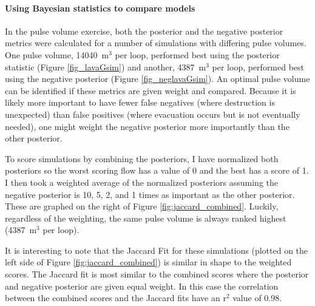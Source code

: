 \documentclass[12pt,letter]{article}
\begin{document}
		\paragraph{Using Bayesian statistics to compare models}

		In the pulse volume exercise, both the posterior and the negative posterior metrics were calculated for a number of simulations with differing pulse volumes. One pulse volume, 14040~m$^3$ per loop, performed best using the posterior statistic (Figure \ref{fig_lavaGsim}) and another, 4387~m$^3$ per loop, performed best using the negative posterior (Figure \ref{fig_neglavaGsim}). An optimal pulse volume can be identified if these metrics are given weight and compared. Because it is likely more important to have fewer false negatives (where destruction is unexpected) than false positives (where evacuation occurs but is not eventually needed), one might weight the negative posterior more importantly than the other posterior.

		To score simulations by combining the posteriors, I have normalized both posteriors so the worst scoring flow has a value of 0 and the best has a score of 1. I then took a weighted average of the normalized posteriors assuming the negative posterior is 10, 5, 2, and 1 times as important as the other posterior. These are graphed on the right of Figure \ref{fig:jaccard_combined}. Luckily, regardless of the weighting, the same pulse volume is always ranked highest (4387~m$^3$ per loop).

		It is interesting to note that the Jaccard Fit for these simulations (plotted on the left side of Figure \ref{fig:jaccard_combined}) is similar in shape to the weighted scores. The Jaccard fit is most similar to the combined scores where the posterior and negative posterior are given equal weight. In this case the correlation between the combined scores and the Jaccard fits have an r$^2$ value of 0.98.

\end{document}
